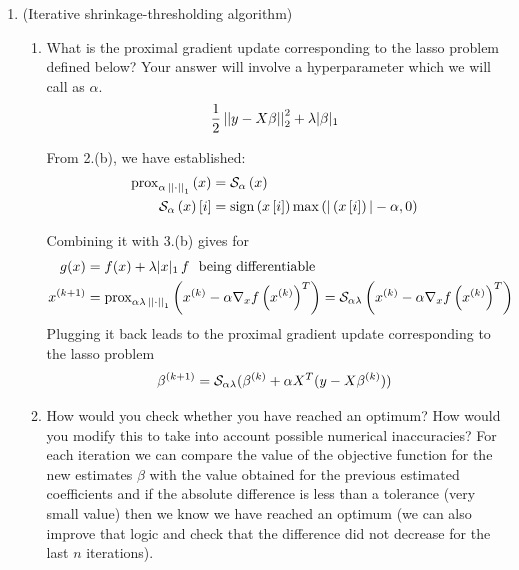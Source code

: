 \documentclass[12pt,twoside]{article}
\begin{document}
\begin{enumerate}
\begin{enumerate}

  \end{enumerate}
  
  \newpage
  \item (Iterative shrinkage-thresholding algorithm)   
 \begin{enumerate}
 \item What is the proximal gradient update corresponding to the lasso problem defined below? Your answer will involve a hyperparameter which we will call as $\alpha$. 
 \begin{align*}
 \frac{1}{2} \left|\left| y - X\beta \right|\right| _{2}^2 + \lambda |\beta|_1
 \end{align*}
 
 From 2.(b), we have established:
 \begin{align*}
\operatorname{prox}_{\alpha \, \left|\left|  \cdot  \right|\right| _{1}}\left(  x  \right) & = \mathcal{ S }_{\alpha}\left( x \right) \\
\mathcal{ S }_{\alpha}\left( x \right)[i] &=  \operatorname{sign}{\left( x\,[i] \right)} \max{ (|\left( x\,[i] \right) | - \alpha , 0) } \\
\end{align*}


Combining it with 3.(b) gives for
 \begin{align*}
 	g(x) &= f(x) + \lambda |x|_1 \, f \text{~ being differentiable} \\
 x^{(k+1)} &= 	\operatorname{prox}_{\alpha \lambda \, \left|\left|  \cdot  \right|\right| _{1}}\left(  x^{(k)}  - \alpha \nabla_x f\left( x^{(k)} \right)^T  \right) = \mathcal{ S }_{\alpha \lambda}\left( x^{(k)}  - \alpha \nabla_x f\left( x^{(k)} \right)^T  \right)
\end{align*}
Plugging it back leads to the proximal gradient update corresponding to the lasso problem 
$$
	 \beta^{(k+1)} =  \mathcal{ S }_{\alpha \lambda} 	(\beta^{(k)} + \alpha X^T (y - X \beta^{(k)}))
$$

 \item How would you check whether you have reached an optimum? How would you modify this to take into account possible numerical inaccuracies?
 For each iteration we can compare the value of the objective function for the new estimates $\beta$ with the value obtained for the previous estimated coefficients and if the absolute difference is less
 than a tolerance (very small  value) then we know we have  reached an optimum (we can also improve that logic and check that the difference did not decrease for the last $n$ iterations).
 

\end{enumerate}
\end{enumerate}
\end{document}
